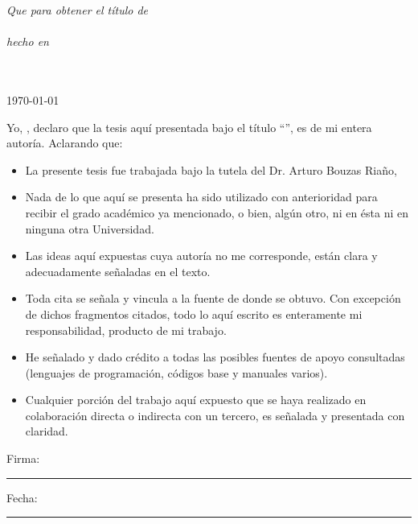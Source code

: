 \documentclass[
11pt, %
spanish, %
singlespacing, %
headsepline, %
]{MastersDoctoralThesis} %
\begin{document}
\begin{titlepage}
\begin{center}
\large \textit{Que para obtener el título de\\ \degreename}\\[0.3cm] %
\textit{hecho en}\\[0.4cm]
\groupname\\\deptname\\[2cm] %
 
\vfill

{\large \today}\\[4cm] %
 
\vfill
\end{center}
\end{titlepage}


\begin{declaration}
\addchaptertocentry{\authorshipname} %
\noindent Yo, \authorname, declaro que la tesis aquí presentada bajo el título \enquote{\ttitle}, es de mi entera autoría. Aclarando que:\\

\begin{itemize} 
\item La presente tesis fue trabajada bajo la tutela del Dr. Arturo Bouzas Riaño, 
\item Nada de lo que aquí se presenta ha sido utilizado con anterioridad para recibir el grado académico ya mencionado, o bien, algún otro, ni en ésta ni en ninguna otra Universidad. 
\item Las ideas aquí expuestas cuya autoría no me corresponde, están clara y adecuadamente señaladas en el texto. 
\item Toda cita se señala y vincula a la fuente de donde se obtuvo. Con excepción de dichos fragmentos citados, todo lo aquí escrito es enteramente mi responsabilidad, producto de mi trabajo. 
\item He señalado y dado crédito a todas las posibles fuentes de apoyo consultadas (lenguajes de programación, códigos base y manuales varios).
\item Cualquier porción del trabajo aquí expuesto que se haya realizado en colaboración directa o indirecta con un tercero, es señalada y presentada con claridad.\\
\end{itemize}
 
\noindent Firma:\\
\rule[0.5em]{25em}{0.5pt} %
 
\noindent Fecha:\\
\rule[0.5em]{25em}{0.5pt} %
\end{declaration}
\end{document}
